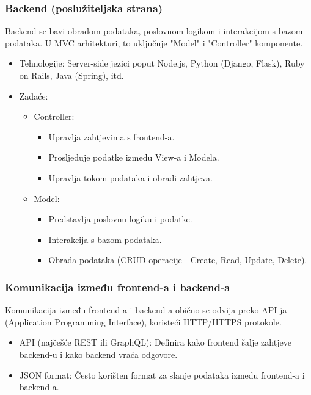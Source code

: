  \subsubsection{Backend (poslužiteljska strana)}

Backend se bavi obradom podataka, poslovnom logikom i interakcijom s bazom podataka. U MVC arhitekturi, to uključuje "Model" i "Controller" komponente.
\begin{itemize}
		  \item {Tehnologije: Server-side jezici poput Node.js, Python (Django, Flask), Ruby on Rails, Java (Spring), itd.}
		  \item { Zadaće:
            \begin{itemize}
		  \item { Controller:
                    \begin{itemize}
		  \item {Upravlja zahtjevima s frontend-a.}
		  \item {Prosljeđuje podatke između View-a i Modela.}	
            \item {Upravlja tokom podataka i obradi zahtjeva.}
	   \end{itemize}}
        \item { Model:
                    \begin{itemize}
		  \item {Predstavlja poslovnu logiku i podatke.}
		  \item {Interakcija s bazom podataka.}	
            \item {Obrada podataka (CRUD operacije - Create, Read, Update, Delete).} \\
	   \end{itemize}}
	   \end{itemize}}	
	   \end{itemize}


 \subsubsection{Komunikacija između frontend-a i backend-a}

Komunikacija između frontend-a i backend-a obično se odvija preko API-ja (Application Programming Interface), koristeći HTTP/HTTPS protokole.
\begin{itemize}
		  \item {API (najčešće REST ili GraphQL): Definira kako frontend šalje zahtjeve backend-u i kako backend vraća odgovore.}
		  \item {JSON format: Često korišten format za slanje podataka između frontend-a i backend-a.}	\\
	   \end{itemize}


